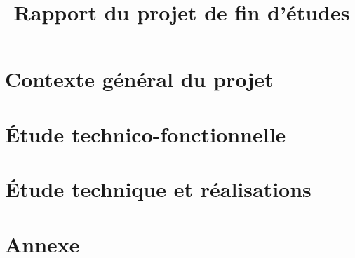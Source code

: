 \documentclass[a4paper, french, 12pt]{report}
\title{Rapport du projet de fin d'études}\let\title\@title
\begin{document}
\begin{titlepage}
  
\end{titlepage}


\ClearShipoutPicture
\newpage









\tableofcontents
\listoftables
\listoffigures



\fancyhead{}
\fancyfoot{}
\fancyfoot[LE,RO]{\thepage}


\part{Contexte général du projet}

\part{Étude technico-fonctionnelle}

\part{Étude technique et réalisations}

\part*{Annexe}

\end{document}
